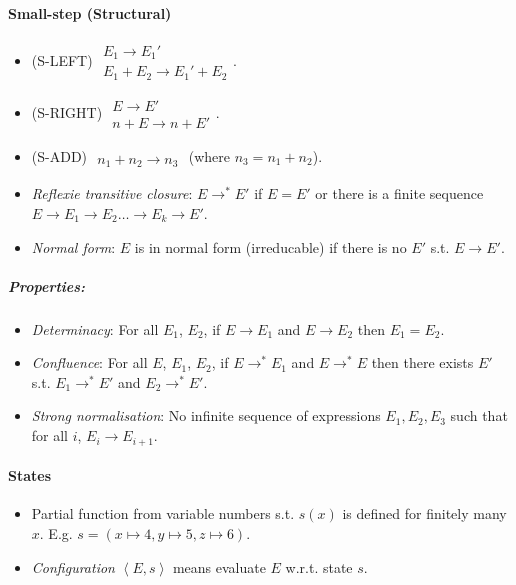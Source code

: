 \documentclass[twocolumn,english]{article}
\begin{document}
\paragraph{Small-step (Structural)}
\begin{itemize}
\item {\scriptsize{}(S-LEFT)} $\begin{array}{c}
E_{1}\rightarrow E_{1}'\\
\hline E_{1}+E_{2}\rightarrow E_{1}'+E_{2}
\end{array}$.
\item {\scriptsize{}(S-RIGHT)} $\begin{array}{c}
E\rightarrow E'\\
\hline n+E\rightarrow n+E'
\end{array}$.
\item {\scriptsize{}(S-ADD)} $\begin{array}{c}
\\
\hline n_{1}+n_{2}\rightarrow n_{3}
\end{array}$ (where $n_{3}=n_{1}+n_{2}$).
\item \emph{Reflexie transitive closure}: $E\rightarrow^{*}E'$ if $E=E'$
or there is a finite sequence $E\rightarrow E_{1}\rightarrow E_{2}\dots\rightarrow E_{k}\rightarrow E'$.
\item \emph{Normal form}: $E$ is in normal form (irreducable) if there
is no $E'$ s.t. $E\rightarrow E'$.
\end{itemize}

\subparagraph{Properties:}
\begin{itemize}
\item \emph{Determinacy}: For all $E_{1}$, $E_{2}$, if $E\rightarrow E_{1}$
and $E\rightarrow E_{2}$ then $E_{1}=E_{2}$.
\item \emph{Confluence}: For all $E$, $E_{1}$, $E_{2}$, if $E\rightarrow^{*}E_{1}$
and $E\rightarrow^{*}E$ then there exists $E'$ s.t. $E_{1}\rightarrow^{*}E'$
and $E_{2}\rightarrow^{*}E'$.
\item \emph{Strong normalisation}: No infinite sequence of expressions $E_{1},E_{2},E_{3}$
such that for all $i$, $E_{i}\rightarrow E_{i+1}$.
\end{itemize}

\paragraph{States}
\begin{itemize}
\item Partial function from variable numbers s.t. $s(x)$ is defined for
finitely many $x$. E.g. $s=\left(x\mapsto4,y\mapsto5,z\mapsto6\right)$.
\item \emph{Configuration} $\left\langle E,s\right\rangle $ means evaluate
$E$ w.r.t. state $s$.
\end{itemize}
\end{document}
